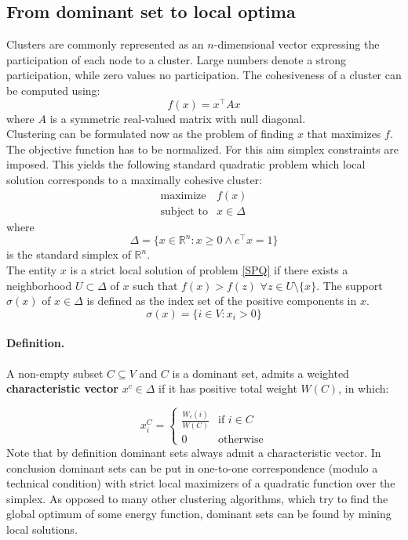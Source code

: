 \subsection{From dominant set to local optima}

Clusters are commonly represented as an $n$-dimensional vector expressing the participation of each node to a cluster. Large numbers denote a strong participation, while zero values no participation. The cohesiveness of a cluster can be computed using:
\begin{equation}
f(x)=x^\top Ax
\end{equation}
where $A$ is a symmetric real-valued matrix with null diagonal.\\
Clustering can be formulated now as the problem of finding $x$ that maximizes $f$. The objective function has to be normalized. For this aim simplex constraints are imposed. This yields the following standard quadratic problem which local solution corresponds to a maximally cohesive cluster:
\begin{equation}\label{SPQ}
\begin{array}{lcl}
\text{maximize} & f(x) \\
\text{subject to} & x \in \Delta
\end{array}
\end{equation}
where
\begin{equation}
\Delta=\{x\in\mathbb{R}^n:x\geq 0 \land e^\top x = 1\}
\end{equation}
is the standard simplex of $\mathbb{R}^n$.\\

The entity $x$ is a strict local solution of problem \ref{SPQ} if there exists a neighborhood $U \subset	\Delta$ of $x$ such that $f(x) > f(z)$ $\forall z \in U\setminus\{x\}$. The support $\sigma(x)$ of $x\in\Delta$ is defined as the index set of the positive components in $x$.
$$\sigma(x) = \{i\in V: x_i > 0\}$$


\paragraph{Definition.} A non-empty subset $C \subseteq V$ and $C$ is a dominant set, admits a weighted \textbf{characteristic vector} $x^c\in \Delta$ if it has positive total weight $W(C)$, in which:

$$
  x_i^C= \begin{cases}
	\frac{W_c(i)}{W(C)} & \text{if } i\in C\\
	0 & \text{otherwise}
\end{cases}
$$
Note that by definition dominant sets always admit a characteristic vector. In conclusion dominant sets can be put in one-to-one correspondence (modulo a technical condition) with strict local maximizers of a quadratic function over the simplex. As opposed to many other clustering algorithms, which try to find the global optimum of some energy function, dominant sets can be found by mining local solutions.




